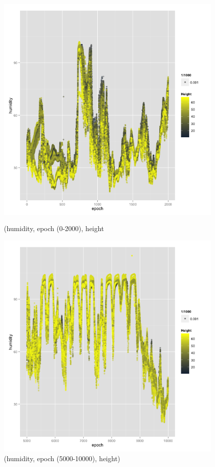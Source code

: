 \documentclass[english]{article}\usepackage[]{graphicx}\usepackage[]{color}
\begin{document}
\begin{figure}[H]
\centering
\begin{minipage}{.50\textwidth}
\centering
\includegraphics[width=\linewidth]{hum2}
\caption{(humidity, epoch (0-2000), height}
\vspace{-10pt}
\end{minipage}\hfill
\begin{minipage}{.50\textwidth}
\centering
\includegraphics[width=\linewidth]{hum1}
\caption{(humidity, epoch (5000-10000), height)}
\vspace{-10pt}
\end{minipage}
\end{figure}
\end{document}
